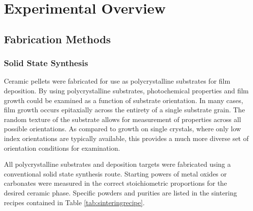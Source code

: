 

\chapter{Experimental Overview}
\label{ch:experimental}




\section{Fabrication Methods}
\label{sec:exp.fabrication}


\subsection{Solid State Synthesis}
\label{subsec:exp.solidstate}


Ceramic pellets were fabricated for use as polycrystalline substrates for film deposition.
By using polycrystalline substrates, photochemical properties and film growth could be
examined as a function of substrate orientation. In many cases, film growth occurs
epitaxially across the entirety of a single substrate grain. The random texture of the
substrate allows for measurement of properties across all possible orientations. As
compared to growth on single crystals, where only low index orientations are typically
available, this provides a much more diverse set of orientation conditions for
examination. 

All polycrystalline substrates and deposition targets were fabricated using a conventional
solid state synthesis route. Starting powers of metal oxides or carbonates were measured
in the correct stoichiometric proportions for the desired ceramic phase. Specific powders
and purities are listed in the sintering recipes contained in Table
\ref{tab:sinteringrecipe}.
 
